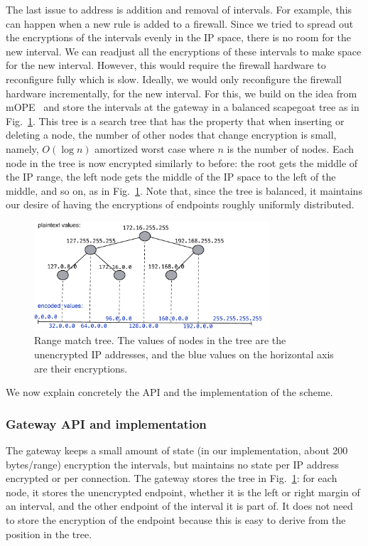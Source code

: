The last issue to address is addition and removal of intervals. For example, this can happen when a new rule is added to a firewall. 
Since we tried to spread out the encryptions of the intervals evenly in the IP space, there is no room for the new interval. We can 
readjust all the encryptions of these intervals to make space for the new interval. However, this would require the firewall hardware to reconfigure fully which is slow. Ideally, we would only reconfigure the firewall hardware incrementally, for the new interval. For this, we build on the idea from mOPE~\cite{popa:mope} and store the intervals at the gateway in a balanced scapegoat tree as in Fig.~\ref{fig:tree}. This tree is a search tree that has the property that when inserting or deleting a node, the number of other nodes that change encryption is small, namely, $O(\log n)$ amortized worst case where $n$ is the number of nodes. Each node in the tree is now encrypted similarly to before: the root gets the middle of the IP range,  the left node gets the middle of the IP space to the left of the middle, and so on, as in Fig.~\ref{fig:tree}.  Note that, since the tree is balanced, it maintains our desire of having the encryptions of endpoints roughly uniformly distributed.

\begin{figure}
  \includegraphics[width=3.45in]{fig/tree}
  \caption{\label{fig:tree} Range match tree. The values of nodes in the tree are the unencrypted IP addresses, and the blue values on the horizontal axis are their encryptions. }
\end{figure}



We now explain concretely the API and the implementation of the scheme. 

\subsubsection{Gateway API and implementation}\label{s:rangealg}

 The gateway keeps a small amount of state (in our implementation, about 200 bytes/range) encryption the intervals, but maintains no state per IP address encrypted or per connection. The gateway stores the tree in Fig.~\ref{fig:tree}: for each node, it stores the unencrypted endpoint, whether it is the left or  right margin of an interval, and the other endpoint of the interval it is part of. It does not need to store the encryption of the endpoint because this is easy to derive from the position in the tree. 


